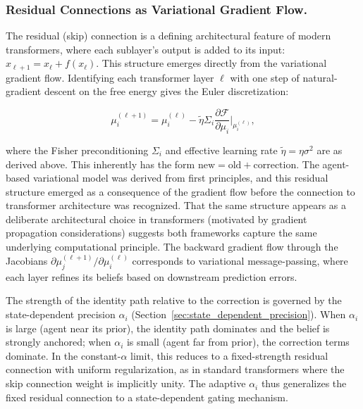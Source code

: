 \documentclass[twoside,11pt]{article}
\begin{document}
\subsubsection{Residual Connections as Variational Gradient Flow.}
\label{sec:residual_connections}

The residual (skip) connection is a defining architectural feature of modern transformers, where each sublayer's output is added to its input: $x_{\ell+1} = x_\ell + f(x_\ell)$. This structure emerges directly from the variational gradient flow. Identifying each transformer layer $\ell$ with one step of natural-gradient descent on the free energy gives the Euler discretization:

\begin{equation}
\mu_i^{(\ell+1)} = \mu_i^{(\ell)} - \tilde{\eta} \Sigma_i \frac{\partial \mathcal{F}}{\partial \mu_i}\bigg|_{\mu_i^{(\ell)}},
\label{eq:residual_gradient_flow}
\end{equation}

where the Fisher preconditioning $\Sigma_i$ and effective learning rate $\tilde{\eta} = \eta\sigma^2$ are as derived above. This inherently has the form $\text{new} = \text{old} + \text{correction}$. The agent-based variational model was derived from first principles, and this residual structure emerged as a consequence of the gradient flow before the connection to transformer architecture was recognized. That the same structure appears as a deliberate architectural choice in transformers (motivated by gradient propagation considerations) suggests both frameworks capture the same underlying computational principle. The backward gradient flow through the Jacobians $\partial\mu_j^{(\ell+1)}/\partial\mu_i^{(\ell)}$ corresponds to variational message-passing, where each layer refines its beliefs based on downstream prediction errors.

The strength of the identity path relative to the correction is governed by the state-dependent precision $\alpha_i$ (Section~\ref{sec:state_dependent_precision}). When $\alpha_i$ is large (agent near its prior), the identity path dominates and the belief is strongly anchored; when $\alpha_i$ is small (agent far from prior), the correction terms dominate. In the constant-$\alpha$ limit, this reduces to a fixed-strength residual connection with uniform regularization, as in standard transformers where the skip connection weight is implicitly unity. The adaptive $\alpha_i$ thus generalizes the fixed residual connection to a state-dependent gating mechanism.
\end{document}

